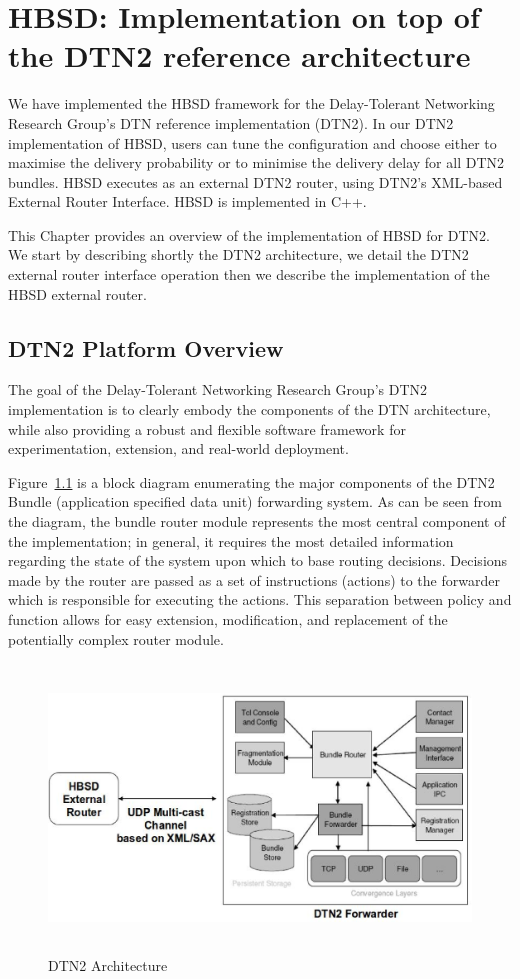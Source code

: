 \chapter{HBSD: Implementation on top of the DTN2 reference architecture}
\label{chapter:HBSD}
\minitoc

We have implemented the HBSD framework for the Delay-Tolerant Networking Research Group's DTN reference implementation (DTN2). 
In our DTN2 implementation of HBSD, users can tune the configuration and choose either to maximise the
delivery probability or to minimise the delivery delay for all DTN2 bundles. HBSD executes as an external DTN2 router, using DTN2's XML-based External Router Interface. HBSD is implemented in C++. 

This Chapter provides an overview of the implementation of HBSD for DTN2. We start by describing shortly the DTN2 architecture, we detail the DTN2 external router interface operation then we describe the implementation of the HBSD external router.

\section{DTN2 Platform Overview}
\label{DTN2}

The goal of the Delay-Tolerant Networking Research Group's DTN2  implementation is to clearly embody the components of the DTN architecture, while also providing a robust and flexible software framework for experimentation, extension, and real-world deployment.

Figure~\ref{DTN2-Arch} is a block diagram enumerating the major components of the DTN2 Bundle (application specified data 
unit) forwarding system. As can be seen from the diagram, the bundle router module represents the most central component of the implementation; in general, it requires the most detailed information regarding the state of the system upon which to base routing decisions. Decisions made by the router are passed as a set of instructions (actions) to the forwarder which is responsible for executing the actions. This separation between policy and function allows for easy extension, modification, and
replacement of the potentially complex router module. 

\begin{figure}[!h]
\centering
\includegraphics[width=5in,height=3in]{Chapitre4/HBSD-DTN2.eps}
\caption{DTN2 Architecture}
\label{DTN2-Arch}
\end{figure}

